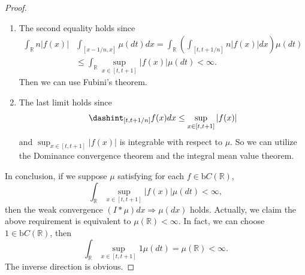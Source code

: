 \documentclass[12pt]{article}
\renewcommand{\(}{\left(}%
\renewcommand{\)}{\right)}%
\renewcommand{\[}{\left[}%
\renewcommand{\]}{\right]}%
\renewcommand{\r}{\mathbb{R}}
\newtheorem{proof}{Proof.}}
\begin{document}
\begin{proof}
\begin{enumerate}
    \item The second equality holds since
   \begin{equation*}
    \begin{split}
     \int_\r n|f(x)|&\int_{[x-1/n,x ]}\mu(dt)dx=\int_\r\(\int_{[t,t+1/n]}n|f(x)|dx\)\mu(dt)\\
     &\leq \int_\r \sup_{x\in[t,t+1]}|f(x)|\mu(dt)<\infty.
    \end{split}
   \end{equation*}
   Then we can use {\sffamily Fubini's theorem}.
    \item The last limit holds since
    \begin{equation*}
     \dashint_{[t,t+1/n]}f(x)dx\leq \sup_{x\in[t,t+1]}|f(x)|
    \end{equation*}
    and $\sup_{x\in[t,t+1]}|f(x)|$ is integrable with respect to $\mu$. So we can utilize the {\sffamily Dominance convergence theorem} and the {\sffamily integral mean value theorem}.
   \end{enumerate}
   In conclusion, if we suppose $\mu$ satisfying for each $f\in \mathrm{b}C(\r)$,
   \begin{equation*}
    \int_{\r}\sup_{x\in[t,t+1]}|f(x)|\mu(dt)<\infty,
   \end{equation*}
   then the weak convergence $(I*\mu)dx\Rightarrow \mu(dx)$ holds. Actually, we claim the above requirement is equivalent to $\mu(\r)<\infty$. In fact, we can choose $1\in \text{b}C(\r)$, then
   \begin{equation*}
    \int_{\r}\sup_{x\in[t,t+1]}1\mu(dt)=\mu(\r)<\infty.
   \end{equation*}
   The inverse direction is obvious.
  \end{proof}
\end{document}

